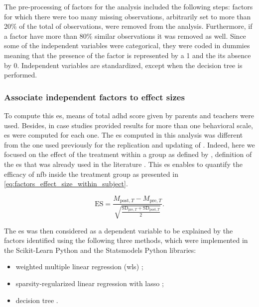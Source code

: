 The pre-processing of factors for the analysis included the following steps: factors for which there were too many missing observations, 
arbitrarily set to more than 20\% of the total of observations, were removed from the analysis. Furthermore, if a factor have more than 
80\% similar observations it was removed as well. Since some of the independent variables were categorical, they were coded in dummies
meaning that the presence of the factor is represented by a 1 and the its absence by 0. Independent variables are standardized, 
except when the decision tree is performed. 

\subsubsection{Associate independent factors to effect sizes}

To compute this \gls{es}, means of total \gls{adhd} score given by parents and teachers were used. Besides, in case studies provided results 
for more than one behavioral scale, \gls{es} were computed for each one. The \gls{es} computed in this analysis was different from the one 
used previously for the replication and updating of \citet{Cortese2016}. Indeed, here we focused on the effect of the treatment within 
a group as defined by \citet{Cohen1988}, definition of the \gls{es} that was already used in the literature \citep{Arns2009, Maurizio2014, 
Strehl2017}. This \gls{es} enables to quantify the efficacy of \gls{nfb} inside the treatment group as presented in \cref{eq:factors_effect_size_within_subject}.

\begin{equation}
\label{eq:factors_effect_size_within_subject}
\text{ES} = \frac{M_{\text{post},T} - M_{\text{pre},T}}  { \sqrt{ \frac{\text{SD}_{\text{pre},T} + \text{SD}_{\text{post},T}} {2} } }.
\end{equation} 

The \gls{es} was then considered as a dependent variable to be explained by the factors identified using the following three methods, which were 
implemented in the Scikit-Learn Python \citep{Pedregosa2011} and the Statsmodels Python\citep{Seabold2010} libraries:
\begin{itemize}
	\item weighted multiple linear regression (\gls{wls}) \citep{Montgomery2012}; 
	\item sparsity-regularized linear regression with \gls{lasso} \citep{Tibshirani1996};
	\item decision tree \citep{Quinlan1986}.
\end{itemize}

